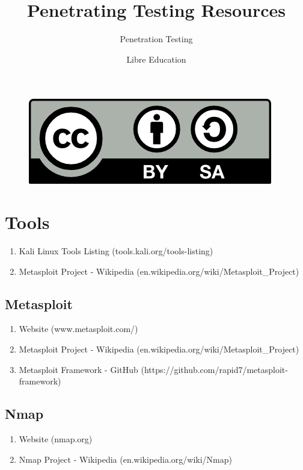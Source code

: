 \documentclass[a4paper]{article}
\title{Penetrating Testing Resources}
\subtitle{Penetration Testing}
\date{}
\author{Libre Education}
\begin{document}
\maketitle


\begin{figure}[b]
\includegraphics{BY-SA}
\centering
\end{figure}

\newpage

\section{Tools}

\begin{enumerate}
	\item Kali Linux Tools Listing (tools.kali.org/tools-listing)
	\item Metasploit Project - Wikipedia (en.wikipedia.org/wiki/Metasploit\_Project)
\end{enumerate}

\subsection{Metasploit}
\begin{enumerate}
	\item Website (www.metasploit.com/)
	\item Metasploit Project - Wikipedia (en.wikipedia.org/wiki/Metasploit\_Project)
    \item Metasploit Framework - GitHub (https://github.com/rapid7/metasploit-framework)
\end{enumerate}

\subsection{Nmap}
\begin{enumerate}
	\item Website (nmap.org)
	\item Nmap Project - Wikipedia (en.wikipedia.org/wiki/Nmap)
\end{enumerate}
\end{document}
